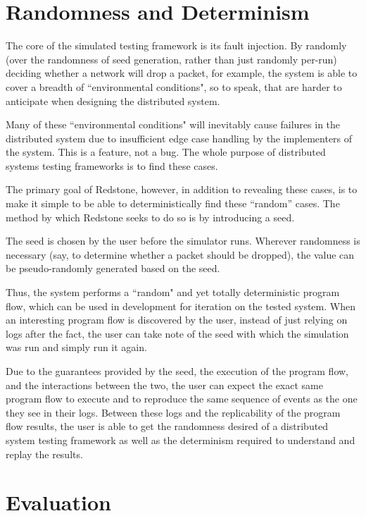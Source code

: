 \section{\txtrsdust Randomness and Determinism}

{\fontsize{12}{15}\selectfont 
The core of the simulated testing framework is its fault injection.
By randomly (over the randomness of seed generation, rather than just randomly per-run)
deciding whether a network will drop a packet,
for example, the system is able to cover a breadth of ``environmental conditions",
so to speak,
that are harder to anticipate when designing the distributed system.

Many of these ``environmental conditions"
will inevitably cause failures in the distributed system due to insufficient edge case handling by the implementers of the system.
This is a feature, not a bug.
The whole purpose of distributed systems testing frameworks is to find these cases.

The primary goal of Redstone, however,
in addition to revealing these cases,
is to make it simple to be able to deterministically find these “random” cases.
The method by which Redstone seeks to do so is by introducing a seed.

The seed is chosen by the user before the simulator runs.
Wherever randomness is necessary
(say, to determine whether a packet should be dropped),
the value can be pseudo-randomly generated based on the seed.

Thus, the system performs a ``random" and yet totally deterministic program flow,
which can be used in development for iteration on the tested system.
When an interesting program flow is discovered by the user,
instead of just relying on logs after the fact,
the user can take note of the seed with which the simulation was run and simply run it again.

Due to the guarantees provided by the seed, the execution of the program flow, and the interactions between the two,
the user can expect the exact same program flow to execute and to reproduce the same sequence of events as the one they see in their logs.
Between these logs and the replicability of the program flow results,
the user is able to get the randomness desired of a distributed system testing framework as well as the determinism required to understand and replay the results.

}

\section{\txtrsdust Evaluation}

